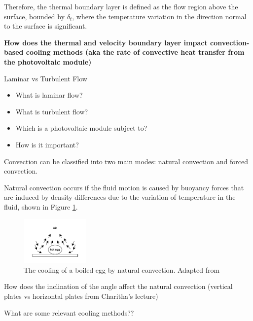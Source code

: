 Therefore, the thermal boundary layer is defined as the flow region above the surface, bounded by $\delta_t$, where the temperature variation in the direction normal to the surface is significant.\par

\vspace{0.5em}

\textbf{How does the thermal and velocity boundary layer impact convection-based cooling methods (aka the rate of convective heat transfer from the photovoltaic module)}\vspace{0.5em}

Laminar vs Turbulent Flow\par
\begin{itemize}
    \item What is laminar flow?
    \item What is turbulent flow?
    \item Which is a photovoltaic module subject to?
    \item How is it important?
\end{itemize}

Convection can be classified into two main modes: natural convection and forced convection. \cite{Cengel2014IntroductionConcepts}

Natural convection occurs if the fluid motion is caused by buoyancy forces that are induced by density differences due to the variation of temperature in the fluid, shown in Figure \ref{fig:cooling_of_boiled_egg_natural_convection}.

\begin{figure}[ht]
    \centering
    \includegraphics[width=0.3\textwidth]{Figures/cooling_of_boiled_egg_natural_convection.pdf}
    \caption{The cooling of a boiled egg by natural convection. Adapted from \cite{Cengel2014IntroductionConcepts}}
    \label{fig:cooling_of_boiled_egg_natural_convection}
\end{figure}

How does the inclination of the angle affect the natural convection (vertical plates vs horizontal plates from Charitha's lecture)\par
What are some relevant cooling methods??\par

